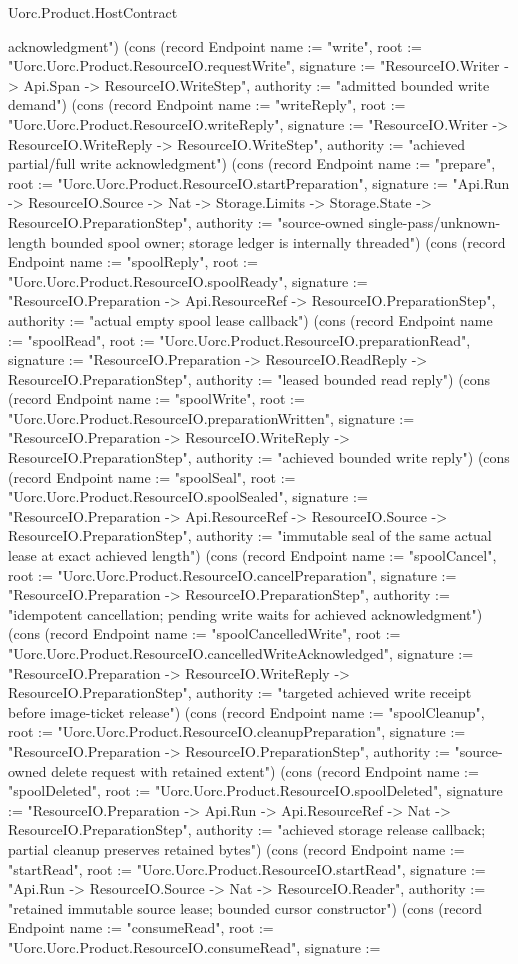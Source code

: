\begin{lexlean}{Uorc.Product.HostContract}
\begin{semanticmodule}
{acknowledgment"}) (cons (record Endpoint {name := "write", root := "Uorc.Uorc.Product.ResourceIO.requestWrite", signature := "ResourceIO.Writer -> Api.Span -> ResourceIO.WriteStep", authority := "admitted bounded write demand"}) (cons (record Endpoint {name := "writeReply", root := "Uorc.Uorc.Product.ResourceIO.writeReply", signature := "ResourceIO.Writer -> ResourceIO.WriteReply -> ResourceIO.WriteStep", authority := "achieved partial/full write acknowledgment"}) (cons (record Endpoint {name := "prepare", root := "Uorc.Uorc.Product.ResourceIO.startPreparation", signature := "Api.Run -> ResourceIO.Source -> Nat -> Storage.Limits -> Storage.State -> ResourceIO.PreparationStep", authority := "source-owned single-pass/unknown-length bounded spool owner; storage ledger is internally threaded"}) (cons (record Endpoint {name := "spoolReply", root := "Uorc.Uorc.Product.ResourceIO.spoolReady", signature := "ResourceIO.Preparation -> Api.ResourceRef -> ResourceIO.PreparationStep", authority := "actual empty spool lease callback"}) (cons (record Endpoint {name := "spoolRead", root := "Uorc.Uorc.Product.ResourceIO.preparationRead", signature := "ResourceIO.Preparation -> ResourceIO.ReadReply -> ResourceIO.PreparationStep", authority := "leased bounded read reply"}) (cons (record Endpoint {name := "spoolWrite", root := "Uorc.Uorc.Product.ResourceIO.preparationWritten", signature := "ResourceIO.Preparation -> ResourceIO.WriteReply -> ResourceIO.PreparationStep", authority := "achieved bounded write reply"}) (cons (record Endpoint {name := "spoolSeal", root := "Uorc.Uorc.Product.ResourceIO.spoolSealed", signature := "ResourceIO.Preparation -> Api.ResourceRef -> ResourceIO.Source -> ResourceIO.PreparationStep", authority := "immutable seal of the same actual lease at exact achieved length"}) (cons (record Endpoint {name := "spoolCancel", root := "Uorc.Uorc.Product.ResourceIO.cancelPreparation", signature := "ResourceIO.Preparation -> ResourceIO.PreparationStep", authority := "idempotent cancellation; pending write waits for achieved acknowledgment"}) (cons (record Endpoint {name := "spoolCancelledWrite", root := "Uorc.Uorc.Product.ResourceIO.cancelledWriteAcknowledged", signature := "ResourceIO.Preparation -> ResourceIO.WriteReply -> ResourceIO.PreparationStep", authority := "targeted achieved write receipt before image-ticket release"}) (cons (record Endpoint {name := "spoolCleanup", root := "Uorc.Uorc.Product.ResourceIO.cleanupPreparation", signature := "ResourceIO.Preparation -> ResourceIO.PreparationStep", authority := "source-owned delete request with retained extent"}) (cons (record Endpoint {name := "spoolDeleted", root := "Uorc.Uorc.Product.ResourceIO.spoolDeleted", signature := "ResourceIO.Preparation -> Api.Run -> Api.ResourceRef -> Nat -> ResourceIO.PreparationStep", authority := "achieved storage release callback; partial cleanup preserves retained bytes"}) (cons (record Endpoint {name := "startRead", root := "Uorc.Uorc.Product.ResourceIO.startRead", signature := "Api.Run -> ResourceIO.Source -> Nat -> ResourceIO.Reader", authority := "retained immutable source lease; bounded cursor constructor"}) (cons (record Endpoint {name := "consumeRead", root := "Uorc.Uorc.Product.ResourceIO.consumeRead", signature := }
\end{semanticmodule}
\end{lexlean}
